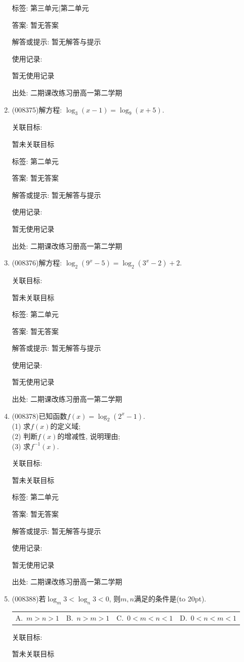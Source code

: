 \documentclass[10pt,a4paper]{article}
\newcommand{\bracket}[1]{(\hbox to #1pt{})}
\newcommand{\fourch}[4]{\par\begin{tabular}{p{.23\textwidth}p{.23\textwidth}p{.23\textwidth}p{.23\textwidth}}
A.~#1 &B.~#2& C.~#3& D.~#4
\end{tabular}}
\begin{document}
\begin{enumerate}[1.]
标签: 第三单元|第二单元

答案: 暂无答案

解答或提示: 暂无解答与提示

使用记录:

暂无使用记录


出处: 二期课改练习册高一第二学期
\item { (008375)}解方程: $\log _3(x-1)=\log _9(x+5)$.


关联目标:

暂未关联目标



标签: 第二单元

答案: 暂无答案

解答或提示: 暂无解答与提示

使用记录:

暂无使用记录


出处: 二期课改练习册高一第二学期
\item { (008376)}解方程: $\log _2(9^x-5)=\log _2(3^x-2)+2$.


关联目标:

暂未关联目标



标签: 第二单元

答案: 暂无答案

解答或提示: 暂无解答与提示

使用记录:

暂无使用记录


出处: 二期课改练习册高一第二学期
\item { (008378)}已知函数$f(x)=\log _2(2^x-1)$.\\
(1) 求$f(x)$的定义域;\\
(2) 判断$f(x)$的增减性, 说明理由;\\
(3) 求$f^{-1}(x)$.


关联目标:

暂未关联目标



标签: 第二单元

答案: 暂无答案

解答或提示: 暂无解答与提示

使用记录:

暂无使用记录


出处: 二期课改练习册高一第二学期
\item { (008388)}若$\log_m 3<\log_n 3<0$, 则$m,n$满足的条件是\bracket{20}.
\fourch{$m>n>1$}{$n>m>1$}{$0<m<n<1$}{$0<n<m<1$}


关联目标:

暂未关联目标




\end{enumerate}
\end{document}
